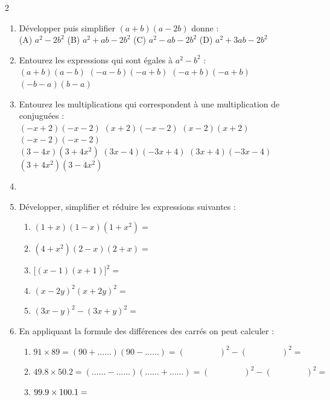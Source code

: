 \documentclass[main.tex]{subfiles}
\begin{document}
\begin{exercise}[\cancel{\faCalculator}] \hfill \vspace{-0.5em}
\begin{spacing}{2}
	\begin{enumerate}[leftmargin=*,label={\arabic*)}]
		\item Développer puis simplifier $(a+b)(a-2b)$ donne : \\
		(A) $a^2-2b^2$ \dotfill (B) $a^2+ab-2b^2$ \dotfill (C) $a^2-ab-2b^2$ \dotfill (D) $a^2+3ab-2b^2$
		\item Entourez les expressions qui sont égales à $a^2-b^2$ :\vspace{-0.5em}\\ 
		$(a+b)(a-b)$\hfill  
		$(-a-b)(-a+b)$\hfill 
		$(-a+b)(-a+b)$\hfill 
		$(-b-a)(b-a)$   
		\item Entourez les multiplications qui correspondent à une multiplication de conjuguées :\vspace{-0.5em}\\
		$(-x+2)(-x-2)$\hfill  
		$(x+2)(-x-2)$\hfill 
		$(x-2)(x+2)$\hfill 
		$(-x-2)(-x-2)$\\
		$(3-4x)(3+4x^2)$\hfill 
		$(3x-4)(-3x+4)$\hfill 
		$(3x+4)(-3x-4)$\hfill 
		$(3+4x^2)(3-4x^2)$
		\item 
		\noindent 
		\item Développer, simplifier et réduire les expressions suivantes :\vspace{-0.5em}
		\begin{enumerate}[label={},leftmargin=*]
			\item  $(1+x)(1-x)(1+x^2)=$\dotfill 
			\item  $(4+x^2)(2-x)(2+x)=$\dotfill 
			\item  $\big[(x-1)(x+1)\big]^2=$ \dotfill  
			\item  $(x-2y)^2(x+2y)^2=$ \dotfill 
			\item $(3x-y)^2-(3x+y)^2=$\dotfill 
		\end{enumerate}  
		\item En appliquant la formule des différences des carrés on peut calculer :
		\begin{enumerate}[label={},leftmargin=*]
			\item  $91\times 89  = (90+ \ldots\ldots)(90-\ldots\ldots) =\left( \qquad\qquad \right)^2- \left( \qquad\qquad \right)^2 = $\dotfill 
			\item $49.8\times 50.2  = (\ldots\ldots- \ldots\ldots)(\ldots\ldots+\ldots\ldots) =\left( \qquad\qquad \right)^2- \left( \qquad\qquad \right)^2 = $\dotfill 
			\item $99.9\times 100.1=\dotfill $ 
		\end{enumerate} 
	\end{enumerate}
\end{spacing}
\end{exercise} 
\end{document}
